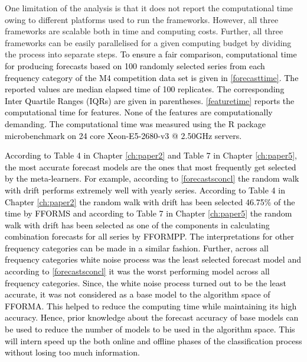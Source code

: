 \documentclass{monashthesis}
\begin{document}
One limitation of the analysis is that it does not report the computational time owing to different platforms used to run the frameworks. However, all three frameworks are scalable both in time and computing costs. Further, all three frameworks can be easily parallelised for a given computing budget by dividing the process into separate steps. \textcolor{black}{To ensure a fair comparison, computational time for producing forecasts based on 100 randomly selected series from each frequency category of the M4 competition data set is given in} \autoref{forecasttime}\textcolor{black}{. The reported values are median elapsed time of 100 replicates. The corresponding Inter Quartile Ranges (IQRs) are given in parentheses.} \autoref{featuretime} \textcolor{black}{reports the computational time for features. None of the features are computationally demanding.} \textcolor{black}{The computational time was measured using the R package microbenchmark} \autocite{microbenchmark} \textcolor{black}{on 24 core Xeon-E5-2680-v3 @ 2.50GHz servers.}

\textcolor{black}{According to Table 4 in Chapter} \ref{ch:paper2} \textcolor{black}{and Table 7 in Chapter} \ref{ch:paper5}\textcolor{black}{, the most accurate forecast models are the ones that most frequently get selected by the meta-learners. For example, according to} \autoref{forecastsconcl} \textcolor{black}{the random walk with drift performs extremely well with yearly series. According to Table 4 in Chapter} \ref{ch:paper2} \textcolor{black}{the random walk with drift has been selected 46.75\% of the time by FFORMS and according to Table 7 in Chapter} \ref{ch:paper5} \textcolor{black}{the random walk with drift has been selected as one of the components in calculating combination forecasts for all series by FFORMPP. The interpretations for other frequency categories can be made in a similar fashion. Further, across all frequency categories white noise process was the least selected forecast model and according to } \autoref{forecastsconcl} \textcolor{black}{it was the worst performing model across all frequency categories. Since, the white noise process turned out to be the least accurate, it was not considered as a base model to the algorithm space of FFORMA. This helped to reduce the computing time while maintaining its high accuracy. Hence, prior knowledge about the forecast accuracy of base models can be used to reduce the number of models to be used in the algorithm space. This will intern speed up the both online and offline phases of the classification  process without losing too much information.}
\end{document}
